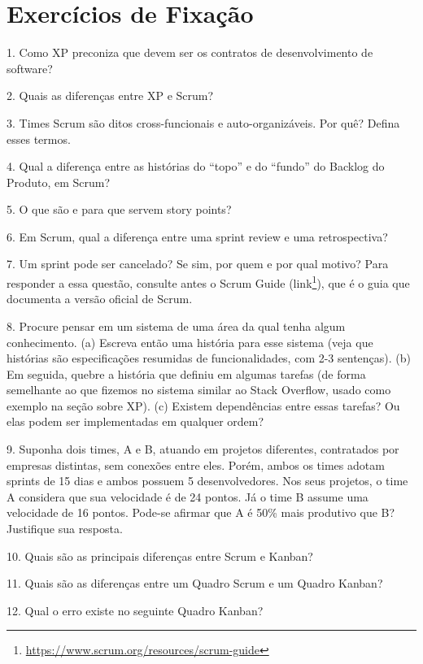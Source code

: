 \documentclass[
  11pt,
  twoside]{book}
\DeclareRobustCommand{\href}[2]{#2\footnote{\url{#1}}}
\begin{document}
\hypertarget{exercuxedcios-de-fixauxe7uxe3o-1}{%
\section*{Exercícios de
Fixação}\label{exercuxedcios-de-fixauxe7uxe3o-1}}

1. Como XP preconiza que devem ser os contratos de desenvolvimento de
software?

2. Quais as diferenças entre XP e Scrum?

3. Times Scrum são ditos cross-funcionais e auto-organizáveis. Por quê?
Defina esses termos.

4. Qual a diferença entre as histórias do ``topo'' e do ``fundo'' do
Backlog do Produto, em Scrum?

5. O que são e para que servem story points?

6. Em Scrum, qual a diferença entre uma sprint review e uma
retrospectiva?

7. Um sprint pode ser cancelado? Se sim, por quem e por qual motivo?
Para responder a essa questão, consulte antes o Scrum Guide
(\href{https://www.scrum.org/resources/scrum-guide}{link}), que é o guia
que documenta a versão oficial de Scrum.

8. Procure pensar em um sistema de uma área da qual tenha algum
conhecimento. (a) Escreva então uma história para esse sistema (veja que
histórias são especificações resumidas de funcionalidades, com 2-3
sentenças). (b) Em seguida, quebre a história que definiu em algumas
tarefas (de forma semelhante ao que fizemos no sistema similar ao Stack
Overflow, usado como exemplo na seção sobre XP). (c) Existem
dependências entre essas tarefas? Ou elas podem ser implementadas em
qualquer ordem?

9. Suponha dois times, A e B, atuando em projetos diferentes,
contratados por empresas distintas, sem conexões entre eles. Porém,
ambos os times adotam sprints de 15 dias e ambos possuem 5
desenvolvedores. Nos seus projetos, o time A considera que sua
velocidade é de 24 pontos. Já o time B assume uma velocidade de 16
pontos. Pode-se afirmar que A é 50\% mais produtivo que B? Justifique
sua resposta.

10. Quais são as principais diferenças entre Scrum e Kanban?

11. Quais são as diferenças entre um Quadro Scrum e um Quadro Kanban?

12. Qual o erro existe no seguinte Quadro Kanban?
\end{document}

